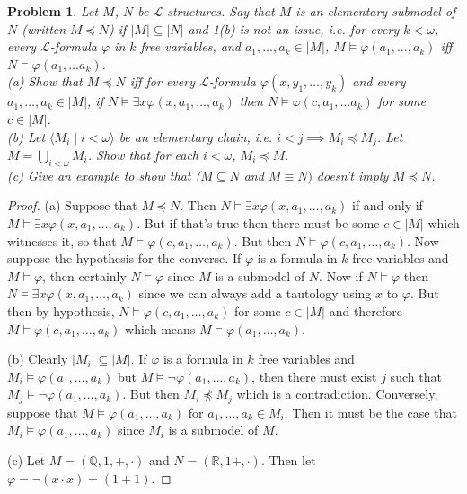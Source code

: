 \documentclass{article}
\newtheorem{problem}{Problem}
\begin{document}
\begin{problem}
Let $M$, $N$ be $\mathcal{L}$ structures. Say that $M$ is an elementary submodel of $N$ (written $M \preceq N$) if $|M| \subseteq |N|$ and 1(b) is not an issue, i.e. for every $k < \omega$, \emph{every} $\mathcal{L}$-formula $\varphi$ in $k$ free variables, and $a_1, \dots , a_k \in |M|$, $M \models \varphi(a_1, \dots , a_k)$ iff $N \models \varphi(a_1, \dots a_k)$.\\
(a) Show that $M \preceq N$ iff for every $\mathcal{L}$-formula $\varphi(x, y_1, \dots , y_k)$ and every $a_1, \dots , a_k \in |M|$, if $N \models \exists x \varphi (x, a_1, \dots , a_k)$ then $N \models \varphi(c, a_1, \dots a_k)$ for some $c \in |M|$.\\
(b) Let $\langle M_i \mid i < \omega \rangle$ be an elementary chain, i.e. $i < j \implies M_i \preceq M_j$. Let $M = \bigcup_{i < \omega} M_i$. Show that for each $i < \omega$, $M_i \preceq M$.\\
(c) Give an example to show that ($M \subseteq N$ and $M \equiv N)$ doesn't imply $M \preceq N$.
\end{problem}
\begin{proof}
(a) Suppose that $M \preceq N$. Then $N \models \exists x \varphi(x, a_1, \dots , a_k)$ if and only if $M \models \exists x \varphi(x, a_1, \dots , a_k)$. But if that's true then there must be some $c \in |M|$ which witnesses it, so that $M \models \varphi(c, a_1, \dots, a_k)$. But then $N \models \varphi(c, a_1, \dots , a_k)$. Now suppose the hypothesis for the converse. If $\varphi$ is a formula in $k$ free variables and $M \models \varphi$, then certainly $N \models \varphi$ since $M$ is a submodel of $N$. Now if $N \models \varphi$ then $N \models \exists x \varphi(x, a_1, \dots , a_k)$ since we can always add a tautology using $x$ to $\varphi$. But then by hypothesis, $N \models \varphi(c, a_1, \dots , a_k)$ for some $c \in |M|$ and therefore $M \models \varphi(c, a_1, \dots , a_k)$ which means $M \models \varphi (a_1, \dots , a_k)$.

(b) Clearly $|M_i| \subseteq |M|$. If $\varphi$ is a formula in $k$ free variables and $M_i \models \varphi(a_1, \dots , a_k)$ but $M \models \neg \varphi(a_1, \dots , a_k)$, then there must exist $j$ such that $M_j \models \neg \varphi(a_1, \dots , a_k)$. But then $M_i \npreceq M_j$ which is a contradiction. Conversely, suppose that $M \models \varphi(a_1, \dots , a_k)$ for $a_1, \dots , a_k \in M_i$. Then it must be the case that $M_i \models \varphi(a_1, \dots , a_k)$ since $M_i$ is a submodel of $M$.

(c) Let $M = (\mathbb{Q}, 1, +, \cdot)$ and $N = (\mathbb{R}, 1 +, \cdot)$. Then let $\varphi = \neg (x \cdot x) = (1 + 1)$.
\end{proof}
\end{document}
